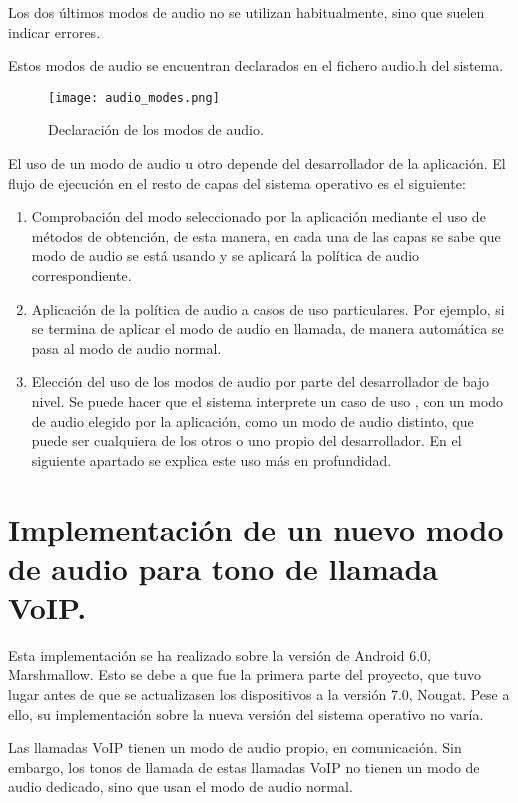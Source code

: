 Los dos últimos modos de audio no se utilizan habitualmente, sino que suelen indicar errores. 

Estos modos de audio se encuentran declarados en el fichero audio.h del sistema.

\begin{figure}[H]
	\centering
	\texttt{[image: audio\_modes.png]}
	\caption{Declaración de los modos de audio.}
	\label{fig:audio_modes}
\end{figure}

El uso de un modo de audio u otro depende del desarrollador de la aplicación. El flujo de ejecución en el resto de capas del sistema operativo es el siguiente:

\begin{enumerate}
	\item Comprobación del modo seleccionado por la aplicación mediante el uso de métodos de obtención, de esta manera, en cada una de las capas se sabe que modo de audio se está usando y se aplicará la política de audio correspondiente.
	\item Aplicación de la política de audio a casos de uso particulares. Por ejemplo, si se termina de aplicar el modo de audio en llamada, de manera automática se pasa al modo de audio normal.
	\item Elección del uso de los modos de audio por parte del desarrollador de bajo nivel. Se puede hacer que el sistema interprete un caso de uso , con un modo de audio elegido por la aplicación, como un modo de audio distinto, que puede ser cualquiera de los otros o uno propio del desarrollador. En el siguiente apartado se explica este uso más en profundidad.
\end{enumerate}


\section{Implementación de un nuevo modo de audio para tono de llamada VoIP.}
Esta implementación se ha realizado sobre la versión de Android 6.0, Marshmallow. Esto se debe a que fue la primera parte del proyecto, que tuvo lugar antes de que se actualizasen los dispositivos a la versión 7.0, Nougat. Pese a ello, su implementación sobre la nueva versión del sistema operativo no varía.

Las llamadas \gls{VoIP} tienen un modo de audio propio, en comunicación. Sin embargo, los tonos de llamada de estas llamadas \gls{VoIP} no tienen un modo de audio dedicado, sino que usan el modo de audio normal.

